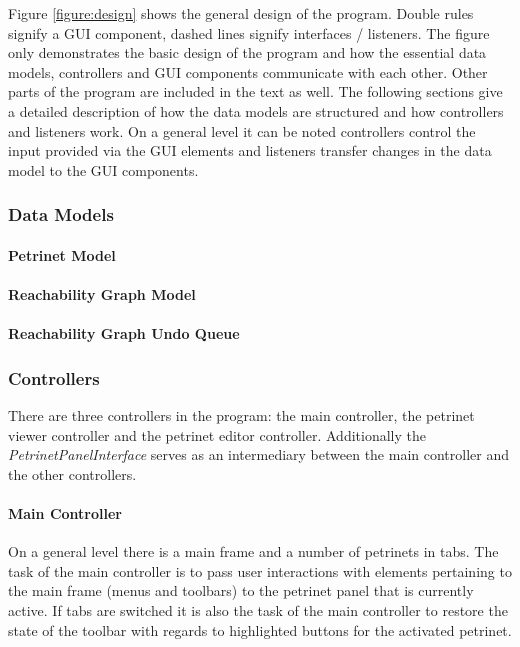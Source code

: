 \documentclass[10pt, a4paper]{article}
\begin{document}
Figure \ref{figure:design} shows the general design of the program. Double rules signify a GUI component, dashed lines signify interfaces / listeners. The figure only demonstrates the basic design of the program and how the essential data models, controllers and GUI components communicate with each other. Other parts of the program are included in the text as well. The following sections give a detailed description of how the data models are structured and how controllers and listeners work. On a general level it can be noted controllers control the input provided via the GUI elements and listeners transfer changes in the data model to the GUI components. 




\subsubsection{Data Models}

\paragraph{Petrinet Model}
\paragraph{Reachability Graph Model}
\paragraph{Reachability Graph Undo Queue}

\subsubsection{Controllers}
There are three controllers in the program: the main controller, the petrinet viewer controller and the petrinet editor controller. Additionally the \textit{PetrinetPanelInterface} serves as an intermediary between the main controller and the other controllers.

\paragraph{Main Controller} On a general level there is a main frame and a number of petrinets in tabs. The task of the main controller is to pass user interactions with elements pertaining to the main frame (menus and toolbars) to the petrinet panel that is currently active. If tabs are switched it is also the task of the main controller to restore the state of the toolbar with regards to highlighted buttons for the activated petrinet. 
\end{document}
